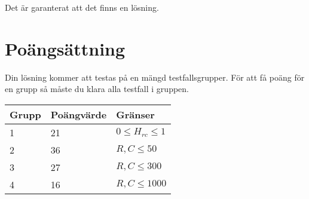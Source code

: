 Det är garanterat att det finns en lösning.

\section*{Poängsättning}
Din lösning kommer att testas på en mängd testfallsgrupper. För att få poäng för en grupp så måste du klara alla testfall i gruppen.

\begin{tabular}{|l|l|l|}
\hline
Grupp & Poängvärde & Gränser \\ \hline
 1     & 21         &  $0 \leq H_{rc} \leq 1$ \\ \hline
 2     & 36         &  $R,C \leq 50$ \\ \hline
 3     & 27         &  $R,C \leq 300$ \\ \hline
 4     & 16         &  $R,C \leq 1000$ \\ \hline
\end{tabular}
